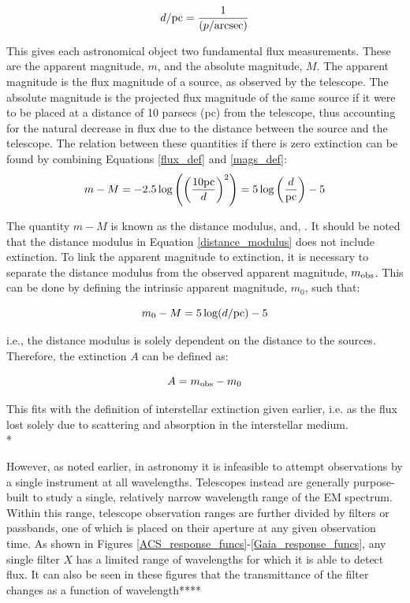 \documentclass[12pt, a4paper]{report}
\begin{document}
\begin{equation}
d/\textnormal{pc} = \frac{1}{(p/\textnormal{arcsec})}
\end{equation}

This gives each astronomical object two fundamental flux measurements. These are the apparent magnitude, $m$, and the absolute magnitude, $M$. The apparent magnitude is the flux magnitude of a source, as observed by the telescope. The absolute magnitude is the projected flux magnitude of the same source if it were to be placed at a distance of 10 parsecs (pc) from the telescope, thus accounting for the natural decrease in flux due to the distance between the source and the telescope. The relation between these quantities if there is zero extinction can be found by combining Equations \ref{flux_def} and \ref{mags_def}:
\begin{equation}
\label{distance_modulus}
m - M = -2.5\log \left( \left(\frac{10\textnormal{pc}}{d}\right)^{2} \right) = 5\log\left(\frac{d}{\textnormal{pc}}\right) - 5
\end{equation}

The quantity $m - M$ is known as the distance modulus, and, . It should be noted that the distance modulus in Equation \ref{distance_modulus} does not include extinction. To link the apparent magnitude to extinction, it is necessary to separate the distance modulus from the observed apparent magnitude, $m_{\textnormal{obs}}$. This can be done by defining the intrinsic apparent magnitude, $m_{0}$, such that:

\begin{equation}
\label{intrinsic_app_mag}
m_{0} - M = 5\log(d/\textnormal{pc}) - 5
\end{equation}

i.e., the distance modulus is solely dependent on the distance to the  sources. Therefore, the extinction $A$ can be defined as:

\begin{equation}
\label{bol_extinc}
A = m_{\textnormal{obs}} - m_{0}
\end{equation}

This fits with the definition of interstellar extinction given earlier, i.e. as the flux lost solely due to scattering and absorption in the interstellar medium.\\*

However, as noted earlier, in astronomy it is infeasible to attempt observations by a single instrument at all wavelengths. Telescopes instead are generally purpose-built to study a single, relatively narrow wavelength range of the EM spectrum. Within this range, telescope observation ranges are further divided by filters or passbands, one of which is placed on their aperture at any given observation time. As shown in Figures \ref{ACS_response_funcs}-\ref{Gaia_response_funcs}, any single filter $X$ has a limited range of wavelengths for which it is able to detect flux. It can also be seen in these figures that the transmittance of the filter changes as a function of wavelength****
\end{document}
